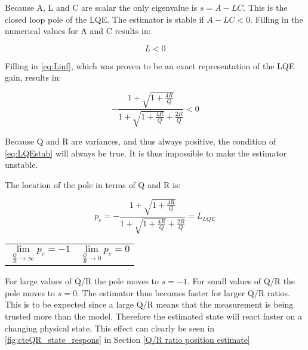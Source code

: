 \documentclass[a4paper]{article}
\newcommand{\newpar}{\vspace{.3cm}\noindent}
\begin{document}
\newpar
Because A, L and C are scalar the only eigenvalue is \(s = A-LC\). This is the closed loop pole of the LQE. The estimator is stable if \(A-LC < 0\). Filling in the numerical values for A and C results in:

\begin{equation}
    L < 0
\end{equation}

\newpar
Filling in \autoref{eq:Linf}, which was proven to be an exact representation of the LQE gain, results in:

\begin{equation}
    -\frac{1+\sqrt{1+\frac{4R}{Q}}}{1+\sqrt{1+\frac{4R}{Q}}+\frac{2R}{Q}} < 0
    \label{eq:LQEstab}
\end{equation}

\newpar
Because Q and R are variances, and thus always positive, the condition of \autoref{eq:LQEstab} will always be true. It is thus impossible to make the estimator unstable.

\newpar
The location of the pole in terms of Q and R is:

\begin{equation}
    p_{e} = -\frac{1+\sqrt{1+\frac{4R}{Q}}}{1+\sqrt{1+\frac{4R}{Q}}+\frac{2R}{Q}} = L_{LQE}
    \label{eq:LQEstab}
\end{equation}

\begin{center}
    \begin{tabular}{p{5cm}p{5cm}}
        \begin{equation}
            \lim_{\frac{Q}{R}\to\infty} p_{e} = -1      \label{eq:perhoinf}
        \end{equation}
        &  
        \begin{equation}
            \lim_{\frac{Q}{R}\to0} p_{e} = 0 
            \label{eq:perho0}
        \end{equation}
        
    \end{tabular}
\end{center}

\newpar
For large values of Q/R the pole moves to \( s = -1\). For small values of Q/R the pole moves to \( s = 0\). The estimator thus becomes faster for larger Q/R ratios. This is to be expected since a large Q/R means that the measurement is being trusted more than the model. Therefore the estimated state will react faster on a changing physical state. This effect can clearly be seen in \autoref{fig:cteQR_state_respons} in Section \ref{Q/R ratio position estimate} 
\end{document}
